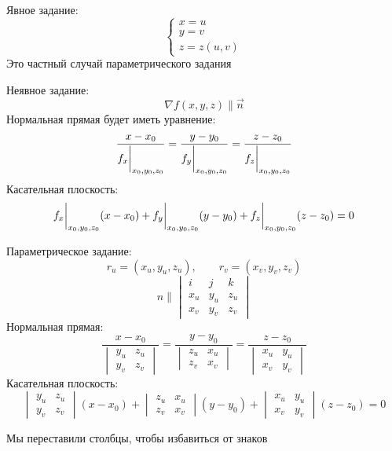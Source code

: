 \begin{exmpls}
	\item Явное задание:
	$$
	\begin{cases}
		x = u \\
		y = v \\
		z = z(u, v)
	\end{cases} $$
	Это частный случай параметрического задания
	\item Неявное задание:
	$$ \nabla f(x, y, z) \parallel \vec{n} $$
	Нормальная прямая будет иметь уравнение:
	$$ \frac{x - x_0}{f_x\bigg|_{x_0, y_0, z_0}^{}} = \frac{y - y_0}{f_y\bigg|_{x_0, y_0, z_0}^{}} = \frac{z - z_0}{f_z\bigg|_{x_0, y_0, z_0}^{}} $$
	Касательная плоскость:
	$$ f_x\bigg|_{x_0, y_0, z_0}^{}(x - x_0) + f_y\bigg|_{x_0, y_0, z_0}^{}(y - y_0) + f_z\bigg|_{x_0, y_0, z_0}^{}(z - z_0) = 0 $$
	\item Параметрическое задание:
	$$ r_u = (x_u, y_u, z_u), \qquad r_v = (x_v, y_v, z_v) $$
	$$ n \parallel
	\begin{vmatrix}
		i & j & k \\
		x_u & y_u & z_u \\
		x_v & y_v & z_v
	\end{vmatrix} $$
	Нормальная прямая:
	$$ \frac{x - x_0}{
		\begin{vmatrix}
			y_u & z_u \\
			y_v & z_v
		\end{vmatrix}} = \frac{y - y_0}{
		\begin{vmatrix}
			z_u & x_u \\
			z_v & x_v
		\end{vmatrix}} = \frac{z - z_0}{
		\begin{vmatrix}
			x_u & y_u \\
			x_v & y_v
		\end{vmatrix}} $$
	Касательная плоскость:
	$$
	\begin{vmatrix}
		y_u & z_u \\
		y_v & z_v
	\end{vmatrix}(x - x_0) +
	\begin{vmatrix}
		z_u & x_u \\
		z_v & x_v
	\end{vmatrix}(y - y_0) +
	\begin{vmatrix}
		x_u & y_u \\
		x_v & y_v
	\end{vmatrix}(z - z_0) = 0 $$
	\begin{remark}
		Мы переставили столбцы, чтобы избавиться от знаков
	\end{remark}
\end{exmpls}


